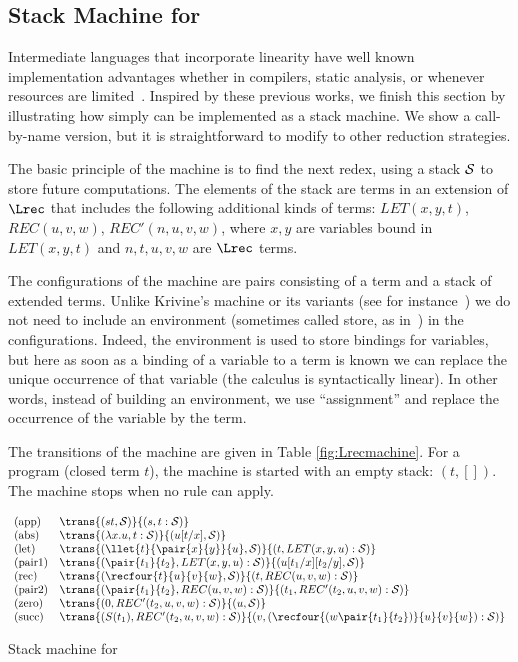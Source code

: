 \documentclass{article}
\begin{document}
\subsection{Stack Machine for \LLCIrec} 
Intermediate languages that incorporate linearity  have well 
known implementation advantages whether in compilers, static analysis, 
or whenever resources are limited~\cite{LafontY:linam,MackieIC:lilfpl,PittsAM:opeplp,David_WalkerChapter}. Inspired by these previous works, we 
finish this section by illustrating how simply \LLCIrec can be 
implemented as a stack machine. We show a call-by-name version, but it
is straightforward to modify to other reduction strategies.

The basic principle of the machine is to find the next redex, using a
stack ${\cal S}$ to store future computations.  The elements of the
stack are terms in an extension of $\Lrec$ that includes the
following additional kinds of terms: $LET(x,y,t)$, $REC(u,v,w)$,
$REC'(n,u,v,w)$, where $x, y$ are variables bound in  $LET(x,y,t)$ and $n,t,u,v,w$ are $\Lrec$
terms.

The configurations of the machine are pairs consisting of a term and a
stack of extended terms.  Unlike Krivine's machine or its variants
(see for instance~\cite{HankinC, Curien91, FernandezM:newdem}) we do
not need to include an environment (sometimes called store, as
in~\cite{David_WalkerChapter}) in the configurations. Indeed, the
environment is used to store bindings for variables, but here as soon
as a binding of a variable to a term is known we can replace the
unique occurrence of that variable (the calculus is syntactically
linear). In other words, instead of building an environment, we use
``assignment'' and replace the occurrence of the variable by the term.

The transitions of the machine are given in Table
\ref{fig:Lrecmachine}. 
For a program (closed term $t$), the machine is
started with an empty stack: $(t,[])$.  The machine stops when no rule
can apply.
\begin{table*}
\[
\begin{array}{llcl}
\mbox{(app)}&\trans{(st,{\cal S})}{(s,t:{\cal S})} \\
\mbox{(abs)}&\trans{(\lambda x.u,t:{\cal S})}{(u[t/x],{\cal S})} \\
\mbox{(let)}&\trans{(\llet{t}{\pair{x}{y}}{u},{\cal S})}{(t,LET(x,y,u):{\cal S})} \\
\mbox{(pair1)}&\trans{(\pair{t_1}{t_2},LET(x,y,u):{\cal S})}{(u[t_1/x][t_2/y],{\cal S})} \\
\mbox{(rec)}&\trans{(\recfour{t}{u}{v}{w},{\cal S})}{(t,REC(u,v,w):{\cal S})} \\
\mbox{(pair2)}&\trans{(\pair{t_1}{t_2},REC(u,v,w):{\cal S})}{(t_1,REC'(t_2,u,v,w):{\cal S})} \\
\mbox{(zero)}&\trans{(0,REC'(t_2,u,v,w):{\cal S})}{(u,{\cal S})} \\
\mbox{(succ)}&\trans{(S(t_1),REC'(t_2,u,v,w):{\cal S})}{(v, (\recfour{(w\pair{t_1}{t_2})}{u}{v}{w}):{\cal S})} \\
\end{array}
\]
\caption{Stack machine for \LLCIrec}\label{fig:Lrecmachine}
\end{table*}
\end{document}
